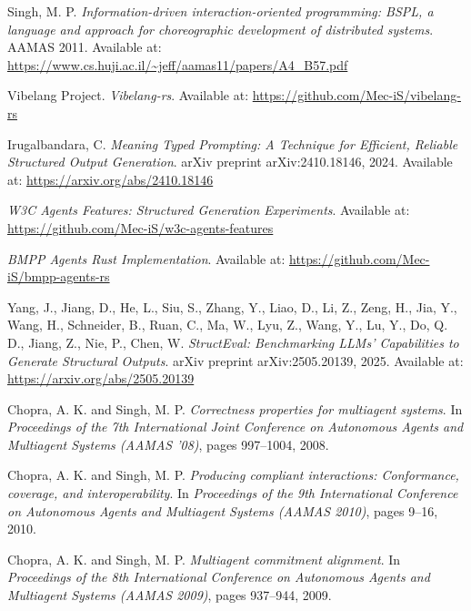 \documentclass[11pt,a4paper]{article}
\begin{document}
	
	\begin{thebibliography}{9}
		
		Singh, M. P.
		\textit{Information-driven interaction-oriented programming: BSPL, a language and approach for choreographic development of distributed systems}.
		AAMAS 2011.
		Available at: \url{https://www.cs.huji.ac.il/~jeff/aamas11/papers/A4_B57.pdf}
		
		Vibelang Project.
		\textit{Vibelang-rs}.
		Available at: \url{https://github.com/Mec-iS/vibelang-rs}
		
		Irugalbandara, C.
		\textit{Meaning Typed Prompting: A Technique for Efficient, Reliable Structured Output Generation}.
		arXiv preprint arXiv:2410.18146, 2024.
		Available at: \url{https://arxiv.org/abs/2410.18146}
		
		\textit{W3C Agents Features: Structured Generation Experiments}.
		Available at: \url{https://github.com/Mec-iS/w3c-agents-features}
		
		\textit{BMPP Agents Rust Implementation}.
		Available at: \url{https://github.com/Mec-iS/bmpp-agents-rs}
		
		Yang, J., Jiang, D., He, L., Siu, S., Zhang, Y., Liao, D., Li, Z., Zeng, H., Jia, Y., Wang, H., Schneider, B., Ruan, C., Ma, W., Lyu, Z., Wang, Y., Lu, Y., Do, Q. D., Jiang, Z., Nie, P., Chen, W.
		\textit{StructEval: Benchmarking LLMs' Capabilities to Generate Structural Outputs}.
		arXiv preprint arXiv:2505.20139, 2025.
		Available at: \url{https://arxiv.org/abs/2505.20139}
		
		Chopra, A. K. and Singh, M. P.
		\textit{Correctness properties for multiagent systems}.
		In \textit{Proceedings of the 7th International Joint Conference on Autonomous Agents and Multiagent Systems (AAMAS '08)}, pages 997--1004, 2008.
		
		Chopra, A. K. and Singh, M. P.
		\textit{Producing compliant interactions: Conformance, coverage, and interoperability}.
		In \textit{Proceedings of the 9th International Conference on Autonomous Agents and Multiagent Systems (AAMAS 2010)}, pages 9--16, 2010.
		
		Chopra, A. K. and Singh, M. P.
		\textit{Multiagent commitment alignment}.
		In \textit{Proceedings of the 8th International Conference on Autonomous Agents and Multiagent Systems (AAMAS 2009)}, pages 937--944, 2009.


\end{thebibliography}
\end{document}
